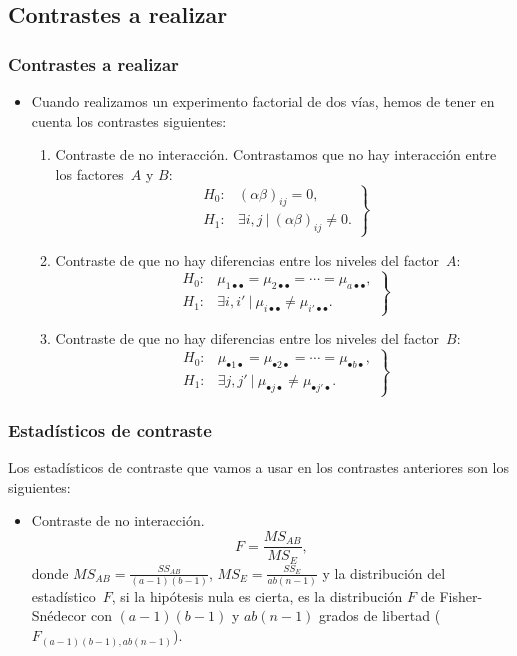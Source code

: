 \subsection{Contrastes a realizar}
\begin{frame}
\frametitle{Contrastes a realizar}
\begin{itemize}
\item<2-> Cuando realizamos un experimento factorial de dos vías, hemos de tener en cuenta los contrastes siguientes:
\begin{enumerate}
\item<3-> Contraste de no interacción. Contrastamos que no hay interacción entre los factores~$A$ y $B$:
\[
\left.
\begin{array}{rl}
H_0 : & (\alpha\beta)_{ij} =0,  \\
H_1 : & \exists i,j\ |\ (\alpha\beta)_{ij}\not = 0.
\end{array}
\right\}
\]
\item<4-> Contraste de que no hay diferencias entre los niveles del factor~$A$:
\[
\left.
\begin{array}{rl}
H_0 : &\mu_{1\bullet\bullet}=\mu_{2\bullet\bullet}=\cdots =\mu_{a\bullet\bullet},  \\
H_1 : & \exists i,i'\ |\ \mu_{i\bullet\bullet}\not = \mu_{i'\bullet\bullet}.
\end{array}
\right\}
\]
\item<5-> Contraste de que no hay diferencias entre los niveles del factor~$B$:
\[
\left.
\begin{array}{rl}
H_0 : &\mu_{\bullet 1\bullet}=\mu_{\bullet 2\bullet}=\cdots =\mu_{ \bullet b\bullet},  \\
H_1 : & \exists j,j'\ |\ \mu_{\bullet j\bullet}\not = \mu_{\bullet j'\bullet}.
\end{array}
\right\}
\]
\end{enumerate}
\end{itemize}
\end{frame}
\begin{frame}
\frametitle{Estadísticos de contraste}
Los estadísticos de contraste que vamos a usar en los contrastes anteriores son los siguientes:
\begin{itemize}
\item<2-> Contraste de no interacción. 
\[
F = \frac{MS_{AB}}{MS_E},
\]
donde $MS_{AB}=\frac{SS_{AB}}{(a-1)(b-1)}$, $MS_E=\frac{SS_E}{ab (n-1)}$ y la distribución del estadístico~$F$, si la hipótesis nula es cierta, es la
distribución $F$ de Fisher-Snédecor con $(a-1)(b-1)$ y $ab(n-1)$ grados de libertad ($F_{(a-1)(b-1),ab(n-1)}$).
\end{itemize}
\end{frame}
